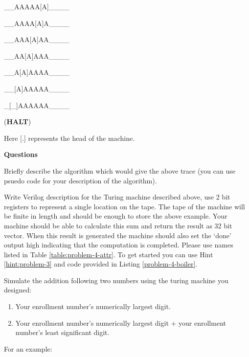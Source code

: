 \documentclass[a4paper,10pt]{article}
\theoremstyle{mytheor}
\newcommand{\problemheading}[1] {
  \vspace{0.3cm}

  {
    \setlength{\parindent}{0}
    \textbf{#1}
  }

  \vspace{0.05cm}
}
\begin{document}
{\begin{legal}
    \item \begin{textsc}\_\_AAAAA[A]\_\_\_\_\end{textsc}
    \item \begin{textsc}\_\_AAAA[A]A\_\_\_\_\end{textsc}
    \item \begin{textsc}\_\_AAA[A]AA\_\_\_\_\end{textsc}
    \item \begin{textsc}\_\_AA[A]AAA\_\_\_\_\end{textsc}
    \item \begin{textsc}\_\_A[A]AAAA\_\_\_\_\end{textsc}
    \item \begin{textsc}\_\_[A]AAAAA\_\_\_\_\end{textsc}
    \item \begin{textsc}\_[\_]AAAAAA\_\_\_\_\end{textsc} (\textbf{HALT})
    \end{legal}

    Here \textsc{[.]} represents the head of the machine.
    
    \problemheading{Questions}
    \begin{legal}
    \item Briefly describe the algorithm which would give the above
      trace (you can use psuedo code for your description of the
      algorithm).
    \item Write Verilog description for the Turing machine described
      above, use 2 bit registers to represent a single location on the
      tape. The tape of the machine will be finite in length and
      should be enough to store the above example. Your machine should
      be able to calculate this sum and return the result as 32 bit
      vector. When this result is generated the machine should also
      set the `done' output high indicating that the computation is
      completed. Please use names listed in Table
      \ref{table:problem-4-attr}. To get started you can use Hint
      \ref{hint:problem-3} and code provided in Listing
      \ref{problem-4-boiler}.
    \item Simulate the addition following two numbers using the turing
      machine you designed:
      \begin{enumerate}
      \item Your enrollment number's numerically largest digit.
      \item Your enrollment number's numerically largest digit + your
        enrollment number's least significant digit.
      \end{enumerate}
      For an example:


\end{legal}}
\end{document}
